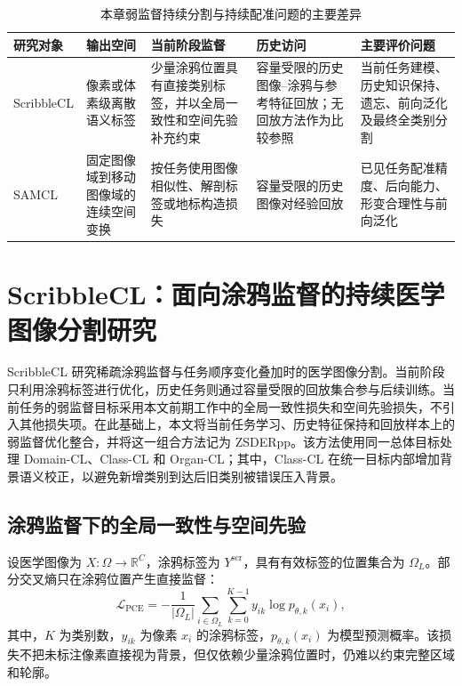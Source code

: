 \begin{table}[htbp]
\centering
\caption{本章弱监督持续分割与持续配准问题的主要差异}
\label{tab:task-cl-problem-comparison}
\thesistablefont
\renewcommand{\arraystretch}{1.18}
\setlength{\tabcolsep}{3pt}
\begin{tabularx}{\textwidth}{@{}p{1.9cm}XXXX@{}}
\toprule
研究对象 & 输出空间 & 当前阶段监督 & 历史访问 & 主要评价问题 \\
\midrule
ScribbleCL &
像素或体素级离散语义标签 &
少量涂鸦位置具有直接类别标签，并以全局一致性和空间先验补充约束 &
容量受限的历史图像--涂鸦与参考特征回放；无回放方法作为比较参照 &
当前任务建模、历史知识保持、遗忘、前向泛化及最终全类别分割 \\
\addlinespace
SAMCL &
固定图像域到移动图像域的连续空间变换 &
按任务使用图像相似性、解剖标签或地标构造损失 &
容量受限的历史图像对经验回放 &
已见任务配准精度、后向能力、形变合理性与前向泛化 \\
\bottomrule
\end{tabularx}
\end{table}

\section{ScribbleCL：面向涂鸦监督的持续医学图像分割研究}
\label{sec:scribblecl}

ScribbleCL 研究稀疏涂鸦监督与任务顺序变化叠加时的医学图像分割。当前阶段只利用涂鸦标签进行优化，历史任务则通过容量受限的回放集合参与后续训练。当前任务的弱监督目标采用本文前期工作中的全局一致性损失和空间先验损失\cite{zhang2026zscribbleseg}，不引入其他损失项。在此基础上，本文将当前任务学习、历史特征保持和回放样本上的弱监督优化整合，并将这一组合方法记为 ZSDERpp。该方法使用同一总体目标处理 Domain-CL、Class-CL 和 Organ-CL；其中，Class-CL 在统一目标内部增加背景语义校正，以避免新增类别到达后旧类别被错误压入背景\cite{cermelli2020mib}。

\subsection{涂鸦监督下的全局一致性与空间先验}
\label{subsec:prior-scribble-foundation}

设医学图像为 $X:\Omega\rightarrow\mathbb{R}^{C}$，涂鸦标签为 $Y^{\mathrm{scr}}$，具有有效标签的位置集合为 $\Omega_L$。部分交叉熵只在涂鸦位置产生直接监督：
\begin{equation}
\mathcal{L}_{\mathrm{PCE}}
=
-\frac{1}{|\Omega_L|}
\sum_{i\in\Omega_L}
\sum_{k=0}^{K-1}
y_{ik}\log p_{\theta,k}(x_i),
\label{eq:scribblecl-pce}
\end{equation}
其中，$K$ 为类别数，$y_{ik}$ 为像素 $x_i$ 的涂鸦标签，$p_{\theta,k}(x_i)$ 为模型预测概率。该损失不把未标注像素直接视为背景，但仅依赖少量涂鸦位置时，仍难以约束完整区域和轮廓。

